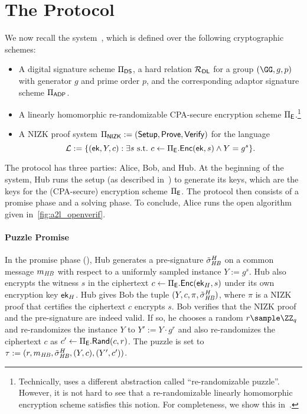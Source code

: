 \section{The \aal Protocol}\label{sec:description_a2l}

We now recall the \aal system~\cite{SP:TaiMorMaf21}, which is defined over the following cryptographic schemes:
\begin{itemize}
    \item A digital signature scheme $\Pi_{\mathsf{DS}}$, a hard relation $\mathcal{R}_{\mathsf{DL}}$ for a group $(\GG, g, p)$ with generator $g$ and prime order $p$, and the corresponding adaptor signature scheme $\Pi_{\mathsf{ADP}}$.
    \item A linearly homomorphic re-randomizable CPA-secure encryption scheme $\Pi_{\mathsf{E}}$.\footnote{Technically, \cite{SP:TaiMorMaf21} uses a different abstraction called ``re-randomizable puzzle''. However, it is not hard to see that a re-randomizable linearly homomorphic encryption scheme satisfies this notion. For completeness, we show this in~.}
    \item A NIZK proof system $\Pi_{\mathsf{NIZK}} := ({\mathsf{Setup}}, \mathsf{Prove}, {\mathsf{Verify}}) $ for the language $$\mathcal{L} := \{ (\mathsf{ek}, Y,c) : \exists s \mathrm{~s.t.~} c \gets \Pi_{\mathsf{E}}.{\mathsf{Enc}}(\mathsf{ek}, s) \land Y = g^s \}.$$
\end{itemize}
The protocol has three parties: Alice, Bob, and Hub. At the beginning of the system, Hub runs the setup (as described in~) to generate its keys, which are the keys for the (CPA-secure) encryption scheme $\Pi_{\mathsf{E}}$. The protocol then consists of a promise phase and a solving phase. To conclude, Alice runs the open algorithm given in~\cref{fig:a2l_openverif}.



\paragraph{Puzzle Promise} 
In the promise phase (), 
Hub generates a pre-signature $\tilde{\sigma}_{\mathit{HB}}^H$ on a common message $ m_{\mathit{HB}}$ with respect to a uniformly sampled instance $Y := g^s$. Hub also encrypts the witness $s$ in the ciphertext $c \gets \Pi_{\mathsf{E}}.{\mathsf{Enc}}(\mathsf{ek}_H,s)$ under its own encryption key $\mathsf{ek}_H$. Hub gives Bob the tuple $(Y, c, \pi, \tilde{\sigma}_{\mathit{HB}}^H)$, where $\pi$ is a NIZK proof that certifies the ciphertext $c$ encrypts $s$.
Bob verifies that the NIZK proof and the pre-signature are indeed valid. If so, he chooses a random $r \sample \ZZ_q$ and re-randomizes the instance $Y$ to $Y' := Y \cdot g^r$ and also re-randomizes the ciphertext $c$ as $c' \gets \Pi_{\mathsf{E}}.\mathsf{Rand}(c,r)$. The puzzle is set to $\tau := (r, m_{\mathit{HB}}, \tilde{\sigma}_{\mathit{HB}}^H, (Y,c), (Y', c'))$. 

